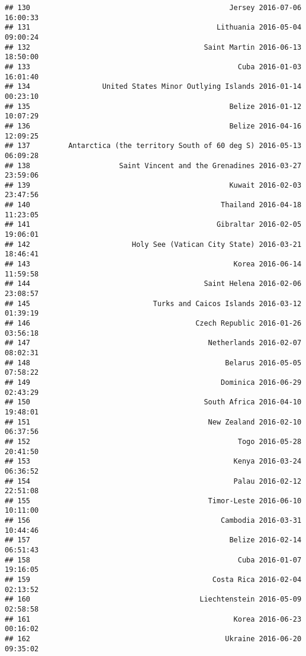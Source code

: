 \documentclass[
]{article}
\begin{document}
\begin{verbatim}
## 130                                               Jersey 2016-07-06 16:00:33
## 131                                            Lithuania 2016-05-04 09:00:24
## 132                                         Saint Martin 2016-06-13 18:50:00
## 133                                                 Cuba 2016-01-03 16:01:40
## 134                 United States Minor Outlying Islands 2016-01-14 00:23:10
## 135                                               Belize 2016-01-12 10:07:29
## 136                                               Belize 2016-04-16 12:09:25
## 137         Antarctica (the territory South of 60 deg S) 2016-05-13 06:09:28
## 138                     Saint Vincent and the Grenadines 2016-03-27 23:59:06
## 139                                               Kuwait 2016-02-03 23:47:56
## 140                                             Thailand 2016-04-18 11:23:05
## 141                                            Gibraltar 2016-02-05 19:06:01
## 142                        Holy See (Vatican City State) 2016-03-21 18:46:41
## 143                                                Korea 2016-06-14 11:59:58
## 144                                         Saint Helena 2016-02-06 23:08:57
## 145                             Turks and Caicos Islands 2016-03-12 01:39:19
## 146                                       Czech Republic 2016-01-26 03:56:18
## 147                                          Netherlands 2016-02-07 08:02:31
## 148                                              Belarus 2016-05-05 07:58:22
## 149                                             Dominica 2016-06-29 02:43:29
## 150                                         South Africa 2016-04-10 19:48:01
## 151                                          New Zealand 2016-02-10 06:37:56
## 152                                                 Togo 2016-05-28 20:41:50
## 153                                                Kenya 2016-03-24 06:36:52
## 154                                                Palau 2016-02-12 22:51:08
## 155                                          Timor-Leste 2016-06-10 10:11:00
## 156                                             Cambodia 2016-03-31 10:44:46
## 157                                               Belize 2016-02-14 06:51:43
## 158                                                 Cuba 2016-01-07 19:16:05
## 159                                           Costa Rica 2016-02-04 02:13:52
## 160                                        Liechtenstein 2016-05-09 02:58:58
## 161                                                Korea 2016-06-23 00:16:02
## 162                                              Ukraine 2016-06-20 09:35:02

\end{verbatim}
\end{document}
